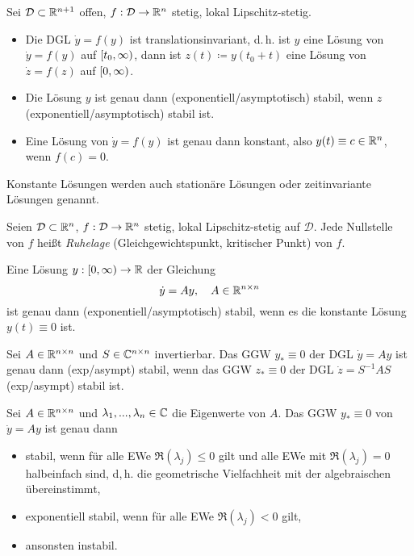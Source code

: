 \documentclass{cheat-sheet}
\newcommand{\D}{\mathcal{D}}
\begin{document}

\begin{satz}
  Sei $\D \subset \R^{n+1}$ offen, $f : \D \to \R^n$ stetig, lokal Lipschitz-stetig.
  \begin{itemize}
    \item Die DGL $\dot{y} = f(y)$ ist translationsinvariant, d.\,h. ist $y$ eine Lösung von $\dot{y} = f(y)$ auf $\left[ t_0, \infty \right)$, dann ist $z(t) \coloneqq y(t_0 + t)$ eine Lösung von $\dot{z} = f(z)$ auf $\left[ 0, \infty \right)$.
    \item Die Lösung $y$ ist genau dann (exponentiell/asymptotisch) stabil, wenn $z$ (exponentiell/asymptotisch) stabil ist.
    \item Eine Lösung von $\dot{y} = f(y)$ ist genau dann konstant, also $y(t) \equiv c \in \mathbb{R}^n$, wenn $f(c) = 0$.
  \end{itemize}
\end{satz}

\begin{sprech}
  Konstante Lösungen werden auch stationäre Lösungen oder zeitinvariante Lösungen genannt.
\end{sprech}

\begin{defn}
  Seien $\D \subset \R^n$, $f : \D \to \R^n$ stetig, lokal Lipschitz-stetig auf $\D$. Jede Nullstelle von $f$ heißt \emph{Ruhelage} (Gleichgewichtspunkt, kritischer Punkt) von $f$.
\end{defn}


\begin{bem}
  Eine Lösung $y : \left[ 0, \infty \right) \to \mathbb{R}$ der Gleichung
  \[ \dot{y} = A y, \quad A \in \mathbb{R}^{n \times n} \]
  ist genau dann (exponentiell/asymptotisch) stabil, wenn es die konstante Lösung $y(t) \equiv 0$ ist.
\end{bem}


\begin{satz}
  Sei $A \in \mathbb{R}^{n \times n}$ und $S \in \mathbb{C}^{n \times n}$ invertierbar. Das GGW $y_* \equiv 0$ der DGL $\dot{y} = Ay$ ist genau dann (exp/asympt) stabil, wenn das GGW $z_* \equiv 0$ der DGL $\dot{z} = S^{-1} A S$ (exp/asympt) stabil ist.
\end{satz}

\begin{satz}
  Sei $A \in \mathbb{R}^{n \times n}$ und $\lambda_1, ..., \lambda_n \in \mathbb{C}$ die Eigenwerte von $A$. Das GGW $y_* \equiv 0$ von $\dot{y} = Ay$ ist genau dann
  \begin{itemize}
    \item stabil, wenn für alle EWe $\Re(\lambda_j) \leq 0$ gilt und alle EWe mit $\Re(\lambda_j) = 0$ halbeinfach sind, d,\,h. die geometrische Vielfachheit mit der algebraischen übereinstimmt,
    \item exponentiell stabil, wenn für alle EWe $\Re(\lambda_j) < 0$ gilt,
    \item ansonsten instabil.
  \end{itemize}
\end{satz}
\end{document}
